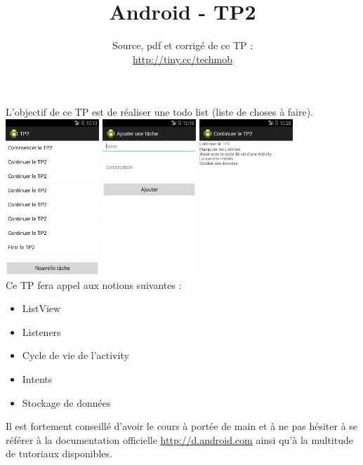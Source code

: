 \documentclass{article}
\title{Android - TP2}
\date{Source, pdf et corrigé de ce TP
:\\ \href{http://tiny.cc/techmob}{http://tiny.cc/techmob}}
\begin{document}
\maketitle
L'objectif de ce TP est de réaliser une todo list (liste de choses à faire).\\
\includegraphics[width=100pt]{img/tp2screen1.png}
\includegraphics[width=100pt]{img/tp2screen2.png}
\includegraphics[width=100pt]{img/tp2screen3.png}\\
Ce TP fera appel aux notions suivantes :
\begin{itemize}
  \item ListView
  \item Listeners
  \item Cycle de vie de l'activity
  \item Intents
  \item Stockage de données
\end{itemize}
Il est fortement conseillé d'avoir le cours à portée de main et à ne pas hésiter
à se référer à la documentation officielle
\href{http://d.android.com}{http://d.android.com} ainsi qu'à la multitude de
tutoriaux disponibles.
\end{document}
